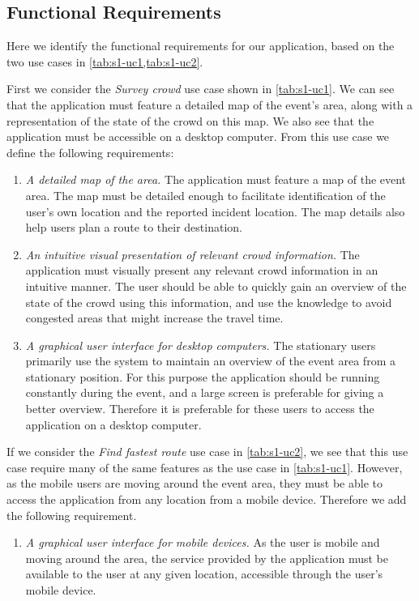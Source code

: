 \subsection{Functional Requirements} \label{ss:s1_freqs}
Here we identify the functional requirements for our application, based on the two use cases in \cref{tab:s1-uc1,tab:s1-uc2}. 

First we consider the \emph{Survey crowd} use case shown in \cref{tab:s1-uc1}. We can see that the application must feature a detailed map of the event's area, along with a representation of the state of the crowd on this map. We also see that the application must be accessible on a desktop computer. From this use case we define the following requirements:

\begin{enumerate}
    \item \emph{A detailed map of the area.} The application must feature a map of the event area. The map must be detailed enough to facilitate identification of the user's own location and the reported incident location. The map details also help users plan a route to their destination.
    \item \emph{An intuitive visual presentation of relevant crowd information.} The application must visually present any relevant crowd information in an intuitive manner. The user should be able to quickly gain an overview of the state of the crowd using this information, and use the knowledge to avoid congested areas that might increase the travel time.
    \item \emph{A graphical user interface for desktop computers.} The stationary users primarily use the system to maintain an overview of the event area from a stationary position. For this purpose the application should be running constantly during the event, and a large screen is preferable for giving a better overview. Therefore it is preferable for these users to access the application on a desktop computer.
\end{enumerate}

If we consider the \emph{Find fastest route} use case in \cref{tab:s1-uc2}, we see that this use case require many of the same features as the use case in \cref{tab:s1-uc1}. However, as the mobile users are moving around the event area, they must be able to access the application from any location from a mobile device. Therefore we add the following requirement.

\begin{enumerate}[resume]
    \item \emph{A graphical user interface for mobile devices.} As the user is mobile and moving around the area, the service provided by the application must be available to the user at any given location, accessible through the user's mobile device.

\end{enumerate}

